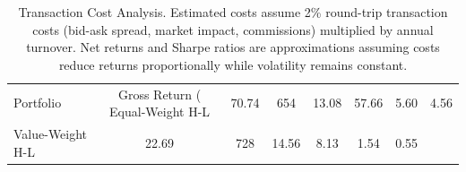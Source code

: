 \begin{table}
\caption{Transaction Cost Analysis. Estimated costs assume 2\% round-trip transaction costs (bid-ask spread, market impact, commissions) multiplied by annual turnover. Net returns and Sharpe ratios are approximations assuming costs reduce returns proportionally while volatility remains constant.}
\label{tab:transaction_costs}
\begin{tabular}{lcccccc}
\toprule
Portfolio & Gross Return (%
\midrule
Equal-Weight H-L & 70.74 & 654 & 13.08 & 57.66 & 5.60 & 4.56 \\
Value-Weight H-L & 22.69 & 728 & 14.56 & 8.13 & 1.54 & 0.55 \\
\bottomrule
\end{tabular}
\end{table}
